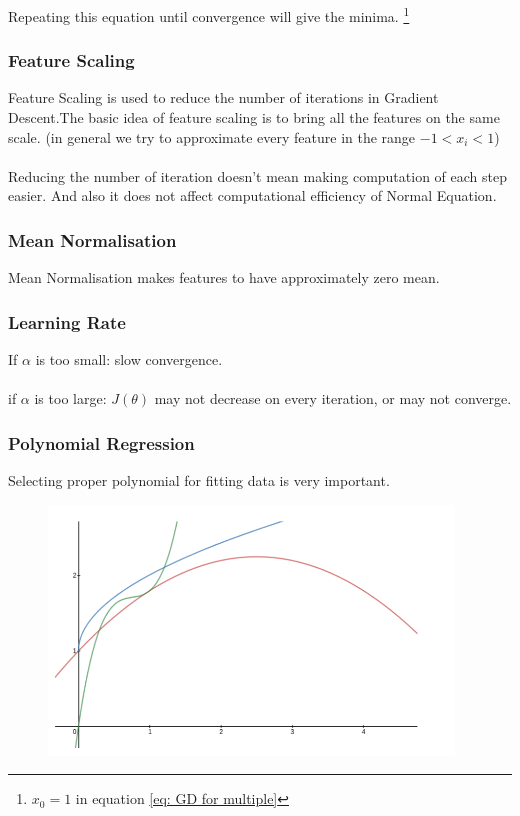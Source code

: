 \documentclass[12pt, A4]{report}
\begin{document}
    Repeating this equation until convergence will give the minima. \footnote[1]{$x_0 = 1$ in equation \ref{eq: GD for multiple}}

  \subsubsection{Feature Scaling}
    Feature Scaling is used to reduce the number of iterations in Gradient Descent.The basic idea of feature scaling is to bring all the features on the same scale. (in general we try to approximate every feature in the range $ -1 < x_i < 1 $)
    \\ \\ Reducing the number of iteration doesn't mean making computation of each step easier. And also it does not affect computational efficiency of Normal Equation.

  \subsubsection{Mean Normalisation}
    Mean Normalisation makes features to have approximately zero mean.

  \subsubsection{Learning Rate}
    If $\alpha$ is too small: slow convergence.\\ \\
    if $\alpha$ is too large: $J(\theta)$ may not decrease on every iteration, or may not converge.

  \subsubsection{Polynomial Regression}
    Selecting proper polynomial for fitting data is very important.

    \begin{figure}[h]
        \includegraphics[scale = 0.6]{polyreg.png}
    \end{figure}
\end{document}
